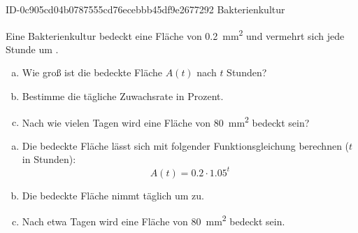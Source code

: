 \begin{exercise}
      {ID-0c905cd04b0787555cd76ecebbb45df9e2677292}
      {Bakterienkultur}
  \ifproblem\problem\par
    Eine Bakterienkultur bedeckt eine Fläche von \SI{0.2}{\square\milli\metre}
    und vermehrt sich jede Stunde um .
    \begin{enumerate}[a)]
      \item Wie groß ist die bedeckte Fläche $A(t)$ nach $t$ Stunden?
      \item Bestimme die tägliche Zuwachsrate in Prozent.
      \item Nach wie vielen Tagen wird eine Fläche von
            \SI{80}{\square\milli\metre} bedeckt sein?
    \end{enumerate}
  \fi
  \ifoutcome\outcome\par
    \begin{enumerate}[a)]
      \item Die bedeckte Fläche lässt sich mit folgender
            Funktionsgleichung berechnen ($t$ in Stunden):
            \begin{equation*}
              A(t)=\num{0.2}\cdot\num{1.05}^{t}
            \end{equation*}
      \item Die bedeckte Fläche nimmt täglich um  zu.
      \item Nach etwa  Tagen wird eine Fläche von
            \SI{80}{\square\milli\metre} bedeckt sein.
    \end{enumerate}
  \fi
\end{exercise}

